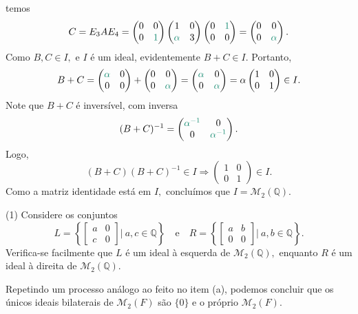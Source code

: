 \documentclass[11pt,a4paper]{article}
\newcommand{\dividiritens}[1]{\begin{tasks}[counter-format={(tsk[a])},label-width=3.6ex, label-format = {\bfseries}, column-sep = {0pt}](1) #1 \end{tasks}}
\newcommand{\pers}[1]{\textcolor{Floresta}{$\negrito{(#1)} $}}
\begin{document}
{\[\]
temos
\[
C = E_3AE_4 = \begin{pmatrix} 0 & 0 \\ 0 & \textcolor{PineGreen}{1} \end{pmatrix}  \begin{pmatrix} 1 & 0 \\ \textcolor{PineGreen}{\alpha} & 3 \end{pmatrix}  \begin{pmatrix}  0 & \textcolor{PineGreen}{1} \\ 0 & 0 \end{pmatrix} = \begin{pmatrix} 0 & 0 \\ 0 & \textcolor{PineGreen}{\alpha} \end{pmatrix}.
\]
Como $B, C \in I,$ e $I$ é um ideal, evidentemente $B + C \in I.$ Portanto,
\[
B + C = \begin{pmatrix} \textcolor{PineGreen}{\alpha} & 0 \\ 0 & 0 \end{pmatrix} + \begin{pmatrix} 0 & 0 \\ 0 & \textcolor{PineGreen}{\alpha} \end{pmatrix} = \begin{pmatrix} \textcolor{PineGreen}{\alpha} & 0 \\ 0 & \textcolor{PineGreen}{\alpha} \end{pmatrix} = \alpha \begin{pmatrix} 1 & 0 \\ 0 & 1 \end{pmatrix} \in I.
\]
Note que $B + C$ é inversível, com inversa
\[
(B + C)^{-1} = \begin{pmatrix} \textcolor{PineGreen}{\alpha^{-1}} & 0 \\ 0 & \textcolor{PineGreen}{\alpha^{-1}} \end{pmatrix}.
\]
Logo,
\[
(B + C)(B + C)^{-1} \in I \Rightarrow  \begin{pmatrix} 1 & 0 \\ 0 & 1 \end{pmatrix} \in I.
\]
Como a matriz identidade está em $I,$ concluímos que $I = \mathcal{M}_2(\mathbb{Q}).$
\dividiritens{
\task[\pers{b}] Considere os conjuntos
\[
L = \left\{ \begin{bmatrix} a & 0 \\ c & 0 \end{bmatrix} \Big| \ a,c \in \mathbb{Q} \right\} \quad \mbox{e} \quad R = \left\{ \begin{bmatrix} a & b \\ 0 & 0 \end{bmatrix} \Big| \ a,b \in \mathbb{Q} \right\}.
\]
Verifica-se facilmente que $L$ é um ideal à esquerda de $\mathcal{M}_{2}(\mathbb{Q}),$ enquanto $R$ é um ideal à direita de $\mathcal{M}_{2}(\mathbb{Q}).$

\task[\pers{c}] Repetindo um processo análogo ao feito no item (a), podemos concluir que os únicos ideais bilaterais de $\mathcal{M}_2(F)$ são $\{ 0\}$ e o próprio $\mathcal{M}_2(F)$.
}
}
\end{document}
